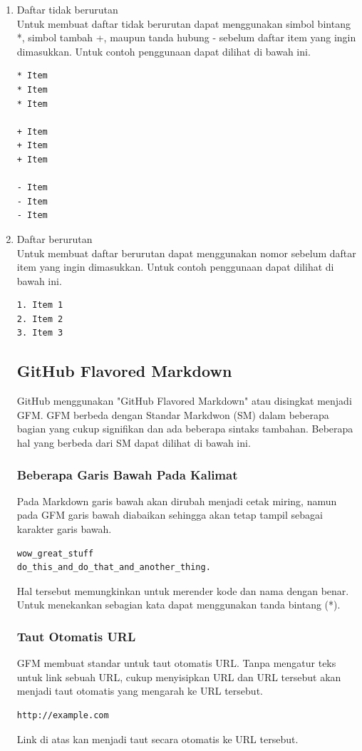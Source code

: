 \begin{enumerate}
\item Daftar tidak berurutan\\
Untuk membuat daftar tidak berurutan dapat menggunakan simbol bintang *, simbol tambah +, maupun tanda hubung - sebelum daftar item yang ingin dimasukkan. Untuk contoh penggunaan dapat dilihat di bawah ini.
\begin{lstlisting}
* Item
* Item
* Item

+ Item
+ Item
+ Item

- Item
- Item
- Item
\end{lstlisting}
\item Daftar berurutan\\
Untuk membuat daftar berurutan dapat menggunakan nomor sebelum daftar item yang ingin dimasukkan. Untuk contoh penggunaan dapat dilihat di bawah ini.
\begin{lstlisting}
1. Item 1
2. Item 2
3. Item 3
\end{lstlisting}

\subsection{GitHub Flavored Markdown \cite{Markdown:2015}}
GitHub menggunakan "GitHub Flavored Markdown" atau disingkat menjadi GFM. GFM berbeda dengan Standar Markdwon (SM) dalam beberapa bagian yang cukup signifikan dan ada beberapa sintaks tambahan. Beberapa hal yang berbeda dari SM dapat dilihat di bawah ini.

\subsubsection{Beberapa Garis Bawah Pada Kalimat}
Pada Markdown garis bawah akan dirubah menjadi cetak miring, namun pada GFM garis bawah diabaikan sehingga akan tetap tampil sebagai karakter garis bawah.
\begin{lstlisting}
wow_great_stuff
do_this_and_do_that_and_another_thing.
\end{lstlisting}
Hal tersebut memungkinkan untuk merender kode dan nama dengan benar. Untuk menekankan sebagian kata dapat menggunakan tanda bintang (*).

\subsubsection{Taut Otomatis URL}
GFM membuat standar untuk taut otomatis URL. Tanpa mengatur teks untuk link sebuah URL, cukup menyisipkan URL dan URL tersebut akan menjadi taut otomatis yang mengarah ke URL tersebut.
\begin{lstlisting}
http://example.com
\end{lstlisting}
Link di atas kan menjadi taut secara otomatis ke URL tersebut.


\end{enumerate}
